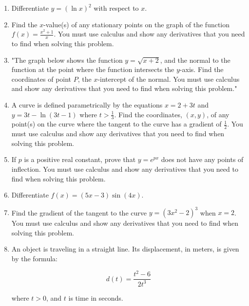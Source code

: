 \documentclass{article}
\begin{document}
\begin{enumerate}
\vspace{3cm}
\item Differentiate \( y = (\ln x)^2 \) with respect to \( x \).
\vspace{3cm}
\item Find the \( x \)-value(s) of any stationary points on the graph of the function \( f(x) = \frac{x^2 + 1}{x} \). You must use calculus and show any derivatives that you need to find when solving this problem.
\vspace{3cm}
\item "The graph below shows the function \( y = \sqrt{x+2} \), and the normal to the function at the point where the function intersects the \( y \)-axis. Find the coordinates of point \( P \), the \( x \)-intercept of the normal. You must use calculus and show any derivatives that you need to find when solving this problem."
\vspace{3cm}
\item A curve is defined parametrically by the equations \( x = 2 + 3t \) and \( y = 3t - \ln(3t - 1) \) where \( t > \frac{1}{3} \). Find the coordinates, \((x, y)\), of any point(s) on the curve where the tangent to the curve has a gradient of \(\frac{1}{2}\). You must use calculus and show any derivatives that you need to find when solving this problem.
\vspace{3cm}
\item If \( p \) is a positive real constant, prove that \( y = e^{px} \) does not have any points of inflection. You must use calculus and show any derivatives that you need to find when solving this problem.
\vspace{3cm}
\item Differentiate \( f(x) = (5x - 3) \sin(4x) \).
\vspace{3cm}
\item Find the gradient of the tangent to the curve \( y = \left(3x^2 - 2\right)^3 \) when \( x = 2 \). You must use calculus and show any derivatives that you need to find when solving this problem.
\vspace{3cm}
\item An object is traveling in a straight line. Its displacement, in meters, is given by the formula:

\[ d(t) = \frac{t^2 - 6}{2t^3} \]

where \( t > 0 \), and \( t \) is time in seconds.


\end{enumerate}
\end{document}
